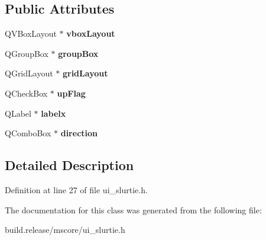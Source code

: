 \subsection*{Public Attributes}
\begin{DoxyCompactItemize}
\item 
\mbox{\label{class_ui___slur_tie_base_ac8747ec469f65b0efcbcc9f03d33034e}} 
Q\+V\+Box\+Layout $\ast$ {\bfseries vbox\+Layout}
\item 
\mbox{\label{class_ui___slur_tie_base_afa084cc3e3e2549201536283a2377b17}} 
Q\+Group\+Box $\ast$ {\bfseries group\+Box}
\item 
\mbox{\label{class_ui___slur_tie_base_a9d7532df9d961f9f909c685c7849256c}} 
Q\+Grid\+Layout $\ast$ {\bfseries grid\+Layout}
\item 
\mbox{\label{class_ui___slur_tie_base_a26137d03a6fe24dc99660d8ef924f201}} 
Q\+Check\+Box $\ast$ {\bfseries up\+Flag}
\item 
\mbox{\label{class_ui___slur_tie_base_ab83f018aab23a143e09e70d5fdbd2e1c}} 
Q\+Label $\ast$ {\bfseries labelx}
\item 
\mbox{\label{class_ui___slur_tie_base_af9f1df26fa2194e952d978cc8ace4887}} 
Q\+Combo\+Box $\ast$ {\bfseries direction}
\end{DoxyCompactItemize}


\subsection{Detailed Description}


Definition at line 27 of file ui\+\_\+slurtie.\+h.



The documentation for this class was generated from the following file\+:\begin{DoxyCompactItemize}
\item 
build.\+release/mscore/ui\+\_\+slurtie.\+h\end{DoxyCompactItemize}

